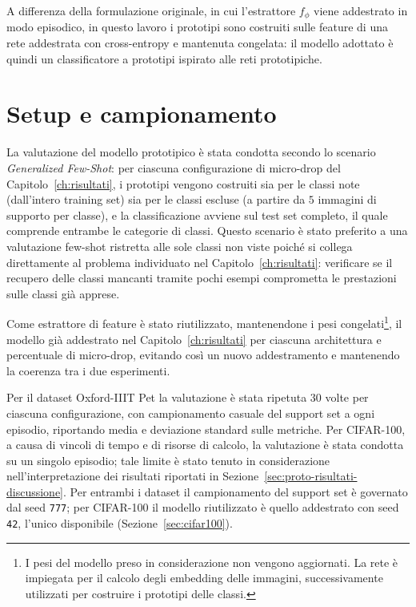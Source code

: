 A differenza della formulazione originale, in cui l'estrattore $f_\phi$ viene addestrato in modo episodico, in questo lavoro i prototipi sono costruiti sulle feature di una rete addestrata con cross-entropy e mantenuta congelata: il modello adottato è quindi un classificatore a prototipi ispirato alle reti prototipiche.

\section{Setup e campionamento}
La valutazione del modello prototipico è stata condotta secondo lo scenario \emph{Generalized Few-Shot}: 
per ciascuna configurazione di micro-drop del Capitolo~\ref{ch:risultati}, i prototipi vengono costruiti sia per le classi note (dall'intero training set) sia per le classi escluse (a partire da $5$ immagini di supporto per classe), 
e la classificazione avviene sul test set completo, il quale comprende entrambe le categorie di classi. 
Questo scenario è stato preferito a una valutazione few-shot ristretta alle sole classi non viste poiché si collega direttamente al problema individuato nel Capitolo~\ref{ch:risultati}: 
verificare se il recupero delle classi mancanti tramite pochi esempi comprometta le prestazioni sulle classi già apprese.

Come estrattore di feature è stato riutilizzato, mantenendone i pesi congelati\footnote{I pesi del modello preso in considerazione non vengono aggiornati. La rete è impiegata per il calcolo degli embedding delle immagini, successivamente utilizzati per costruire i prototipi delle classi.},
il modello già addestrato nel Capitolo~\ref{ch:risultati} per ciascuna architettura e percentuale di micro-drop, 
evitando così un nuovo addestramento e mantenendo la coerenza tra i due esperimenti.

Per il dataset Oxford-IIIT Pet la valutazione è stata ripetuta $30$ volte per ciascuna configurazione, con campionamento casuale del support set a ogni episodio, 
riportando media e deviazione standard sulle metriche. Per CIFAR-100, a causa di vincoli di tempo e di risorse di calcolo, 
la valutazione è stata condotta su un singolo episodio; tale limite è stato tenuto in considerazione nell'interpretazione dei risultati riportati in Sezione~\ref{sec:proto-risultati-discussione}.
Per entrambi i dataset il campionamento del support set è governato dal seed \texttt{777}; per CIFAR-100 il modello riutilizzato è quello addestrato con seed \texttt{42}, l'unico disponibile (Sezione~\ref{sec:cifar100}).

